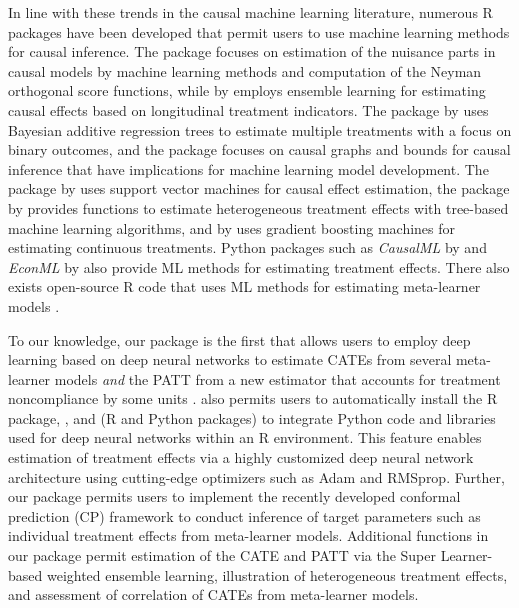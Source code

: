 In line with these trends in the causal machine learning literature,
numerous R packages have been developed that permit users to use machine
learning methods for causal inference. The package 
\citet{bachDoubleML} focuses on estimation of the nuisance parts in causal
models by machine learning methods and computation of the Neyman
orthogonal score functions, while  by \citet{diaz2021} employs
ensemble learning for estimating causal effects based on longitudinal
treatment indicators. The  package by \citet{Hu2022} uses
Bayesian additive regression trees to estimate multiple treatments with
a focus on binary outcomes, and the package 
\citet{Jonzon2023} focuses on causal graphs and bounds for causal inference
that have implications for machine learning model development. The
 package by \citet{SVMMatch} uses support vector machines for
causal effect estimation, the  package by \citet{htetree}
provides functions to estimate heterogeneous treatment effects with
tree-based machine learning algorithms, and  by
\citet{twangContinuous} uses gradient boosting machines for estimating
continuous treatments. Python packages such as \emph{CausalML} by
\citet{zhao2023causalML} and \emph{EconML} by \citet{econml} also provide ML methods for
estimating treatment effects. There also exists open-source R code that
uses ML methods for estimating meta-learner models \citep{Kunzel2019meta, nie2021quasi}.

To our knowledge, our  package is the first that
allows users to employ deep learning based on deep neural networks to
estimate CATEs from several meta-learner models \emph{and} the PATT from a
new estimator that accounts for treatment noncompliance by some units
\citep{ottoboni2020PATT}.  also permits users to
automatically install the  R package, ,
and  (R and Python packages) to integrate Python code and
libraries used for deep neural networks within an R environment. This
feature enables estimation of treatment effects via a highly customized
deep neural network architecture using cutting-edge optimizers such as
Adam and RMSprop. Further, our package permits users to implement the
recently developed conformal prediction (CP) framework to conduct
inference of target parameters such as individual treatment effects from
meta-learner models. Additional functions in our package permit
estimation of the CATE and PATT via the Super Learner-based weighted
ensemble learning, illustration of heterogeneous treatment effects, and
assessment of correlation of CATEs from meta-learner models.

